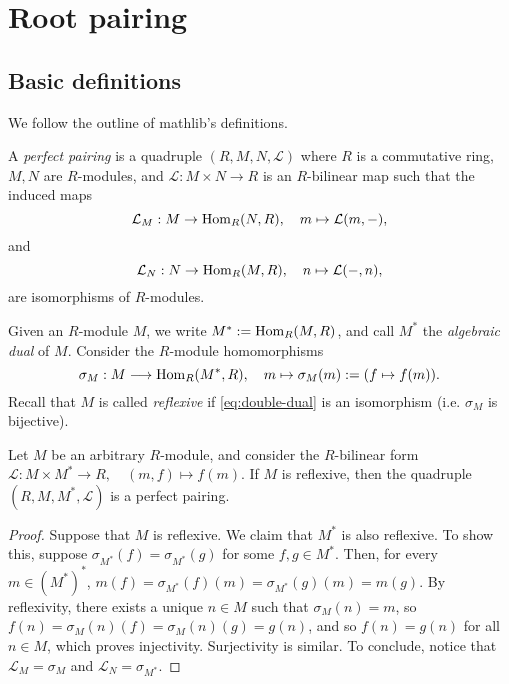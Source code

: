 \chapter{Root pairing}
\label{cha:root-pairing}
\section{Basic definitions}
\label{sec:basic-definitions}

We follow the outline of mathlib's definitions. 

\begin{definition}
   \label{def:perfect-pairing}
   \leanok
    A {\it perfect pairing} is a quadruple $(R,M,N,\mathcal{L})$ where $R$ is a commutative ring, $M,N$ are 
    $R$-modules, and $\mathcal{L} : M \times N \to R$ is an $R$-bilinear map such that the induced maps
    \[
        \mathcal{L}_M : M \to {\rm Hom}_R(N,R), \quad m \mapsto \mathcal{L}(m,-),
    \]
    and 
    \[
        \mathcal{L}_N : N \to {\rm Hom}_R(M,R), \quad n \mapsto \mathcal{L}(-,n),
    \]
    are isomorphisms of $R$-modules.
\end{definition}
Given an $R$-module $M$, we write $M^* := {\rm Hom}_R(M,R)$, and call $M^*$ the 
{\it algebraic dual} of $M$. Consider the $R$-module homomorphisms
\begin{equation}\label{eq:double-dual}
   \sigma_M: M \longrightarrow {\rm Hom}_R(M^*,R), \quad m \mapsto \sigma_M(m) := (f \mapsto f(m)).
\end{equation}
Recall that $M$ is called {\it reflexive} if \eqref{eq:double-dual} is an isomorphism 
(i.e. $\sigma_M$ is bijective). 
\begin{lemma}\label{lem:reflexive-perf-pairing}
    Let $M$ be an arbitrary $R$-module, and consider the $R$-bilinear form 
    $\mathcal{L} : M \times M^* \to R, \quad (m,f) \mapsto f(m)$. If $M$ is reflexive, then the
    quadruple $(R,M, M^*, \mathcal{L})$ is a perfect pairing.
\end{lemma}
\begin{proof}
Suppose that $M$ is reflexive. We claim that $M^*$ is also reflexive. To show this, suppose $\sigma_{M^*}(f) = \sigma_{M^*}(g)$ for some $f,g \in M^*$. Then, for every $m \in (M^*)^*$,  $m(f) = \sigma_{M^*}(f)(m) = \sigma_{M^*}(g)(m) = m(g)$. By reflexivity, there exists a unique $n \in M$ such that $\sigma_M(n) = m$, so $f(n) = \sigma_M(n)(f) = \sigma_M(n)(g) = g(n)$, and so $f(n) = g(n)$ for all $n \in M$, which proves injectivity. Surjectivity is similar. To conclude, notice that $\mathcal{L}_M = \sigma_M$ and $\mathcal{L}_{N} = \sigma_{M^*}$.
\end{proof}

